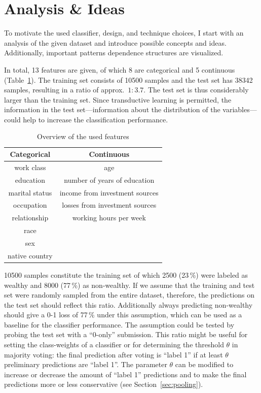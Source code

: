 \documentclass[a4paper]{article}
\begin{document}
\section{Analysis \& Ideas}
\label{sec:analysis}

To motivate the used classifier, design, and technique choices, I
start with an analysis of the given dataset and introduce possible
concepts and ideas. Additionally, important patterns dependence
structures are visualized.

In total, 13 features are given, of which 8 are categorical and 5
continuous (Table~\ref{tab:features}).
The training set consists of 10500 samples and the test set has 38342
samples, resulting in a ratio of approx.\ $1:3.7$.  The test set is
thus considerably larger than the training set.
Since transductive learning is permitted, the information in the test
set---information about the distribution of the variables---could help
to increase the classification performance.

\begin{table}[h]
  \centering
  \begin{tabular}{cc}
    \toprule
  Categorical  & Continuous                     \\
    \midrule
    work class & age                            \\
    education  & number of years of education   \\
marital status & income from investment sources \\
occupation     & losses from investment sources \\
relationship   & working hours per week         \\
race           &                                \\
sex            &                                \\
native country &                                \\
      \bottomrule
  \end{tabular}
  \caption{{Overview of the used features}}
  \label{tab:features}
\end{table}

10500 samples constitute the training set of which 2500 (23\,\%) were
labeled as wealthy and 8000 (77\,\%) as non-wealthy. If we assume that
the training and test set were randomly sampled from the entire
dataset, therefore, the predictions on the test set should reflect
this ratio. Additionally always predicting non-wealthy should give a
0-1 loss of 77\,\% under this assumption, which can be used as a
baseline for the classifier performance. The assumption could be tested
by probing the test set with a ``0-only'' submission. This ratio might
be useful for setting the class-weights of a classifier or for
determining the threshold $\theta$ in majority voting: the final
prediction after voting is ``label 1'' if at least $\theta$
preliminary predictions are ``label 1''. The parameter $\theta$ can be
modified to increase or decrease the amount of ``label 1'' predictions
and to make the final predictions more or less conservative (see
Section~\ref{sec:pooling}).
\end{document}
